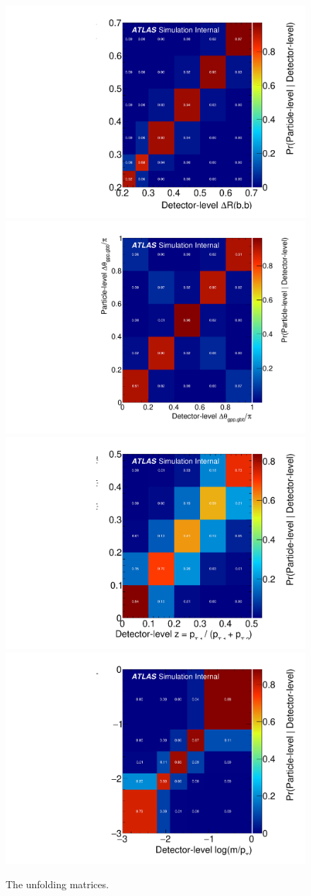 \begin{figure}[htpb!]
\begin{center}
  \includegraphics[width=0.4\linewidth]{figures/gbb/Unfolding/dR_ResponseMatrix_x.pdf}
  \includegraphics[width=0.4\linewidth]{figures/gbb/Unfolding/dphi_ResponseMatrix_x.pdf}
  \includegraphics[width=0.4\linewidth]{figures/gbb/Unfolding/ZpT_ResponseMatrix_x.pdf}
  \includegraphics[width=0.4\linewidth]{figures/gbb/Unfolding/fracmasspt_ResponseMatrix_x.pdf}
\caption[]{The unfolding matrices.  } 
\label{fig:gbb-responsematrix1}
\end{center}
\end{figure}

\clearpage

